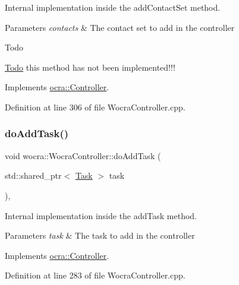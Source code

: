 Internal implementation inside the add\+Contact\+Set method.


\begin{DoxyParams}{Parameters}
{\em contacts} & The contact set to add in the controller\\
\hline
\end{DoxyParams}
\begin{DoxyRefDesc}{Todo}
\item[\hyperlink{todo__todo000003}{Todo}]this method has not been implemented!!!\end{DoxyRefDesc}


Implements \hyperlink{classocra_1_1Controller_acb11edc1ceaa89423c1e58f9cb38a9f7}{ocra\+::\+Controller}.



Definition at line 306 of file Wocra\+Controller.\+cpp.

\hypertarget{classwocra_1_1WocraController_aa9a681aa5c0f043638d4d2956c2913c1}{}\label{classwocra_1_1WocraController_aa9a681aa5c0f043638d4d2956c2913c1} 
\subsubsection{\texorpdfstring{do\+Add\+Task()}{doAddTask()}}
{\footnotesize\ttfamily void wocra\+::\+Wocra\+Controller\+::do\+Add\+Task (\begin{DoxyParamCaption}\item[{std\+::shared\+\_\+ptr$<$ \hyperlink{classocra_1_1Task}{Task} $>$}]{task }\end{DoxyParamCaption})\hspace{0.3cm}{\ttfamily [protected]}, {\ttfamily [virtual]}}

Internal implementation inside the add\+Task method.


\begin{DoxyParams}{Parameters}
{\em task} & The task to add in the controller \\
\hline
\end{DoxyParams}


Implements \hyperlink{classocra_1_1Controller_ab3477822a9363553c99eefa58ff803eb}{ocra\+::\+Controller}.



Definition at line 283 of file Wocra\+Controller.\+cpp.

\hypertarget{classwocra_1_1WocraController_aaf750c45d062220e3f78ccb1c8a41d07}{}\label{classwocra_1_1WocraController_aaf750c45d062220e3f78ccb1c8a41d07} 

